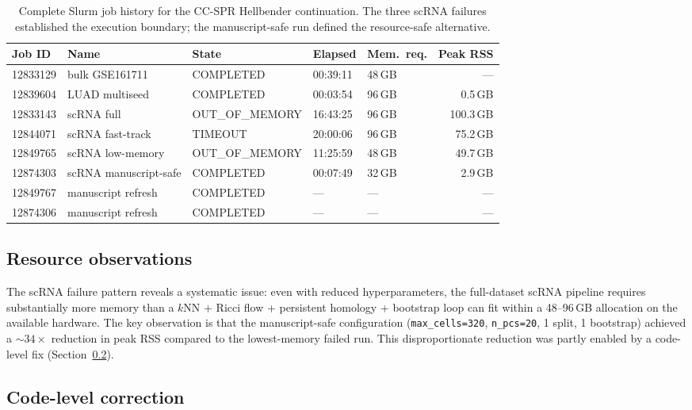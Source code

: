 \documentclass[11pt]{article}
\begin{document}
\begin{table}[h]
\centering
\small
\begin{tabular}{lllllr}
\toprule
Job ID & Name & State & Elapsed & Mem.\ req. & Peak RSS \\
\midrule
12833129 & bulk GSE161711 & COMPLETED & 00:39:11 & 48\,GB & --- \\
12839604 & LUAD multiseed & COMPLETED & 00:03:54 & 96\,GB & 0.5\,GB \\
12833143 & scRNA full & OUT\_OF\_MEMORY & 16:43:25 & 96\,GB & 100.3\,GB \\
12844071 & scRNA fast-track & TIMEOUT & 20:00:06 & 96\,GB & 75.2\,GB \\
12849765 & scRNA low-memory & OUT\_OF\_MEMORY & 11:25:59 & 48\,GB & 49.7\,GB \\
12874303 & scRNA manuscript-safe & COMPLETED & 00:07:49 & 32\,GB & 2.9\,GB \\
12849767 & manuscript refresh & COMPLETED & --- & --- & --- \\
12874306 & manuscript refresh & COMPLETED & --- & --- & --- \\
\bottomrule
\end{tabular}
\caption{Complete Slurm job history for the CC-SPR Hellbender continuation.
The three scRNA failures established the execution boundary; the manuscript-safe run defined the resource-safe alternative.}
\label{tab:jobs}
\end{table}

\subsection{Resource observations}

The scRNA failure pattern reveals a systematic issue: even with reduced hyperparameters, the full-dataset scRNA pipeline requires substantially more memory than a $k$NN + Ricci flow + persistent homology + bootstrap loop can fit within a 48--96\,GB allocation on the available hardware.
The key observation is that the manuscript-safe configuration (\texttt{max\_cells=320}, \texttt{n\_pcs=20}, 1 split, 1 bootstrap) achieved a ${\sim}34\times$ reduction in peak RSS compared to the lowest-memory failed run.
This disproportionate reduction was partly enabled by a code-level fix (Section~\ref{sec:codefix}).

\subsection{Code-level correction}
\label{sec:codefix}
\end{document}
